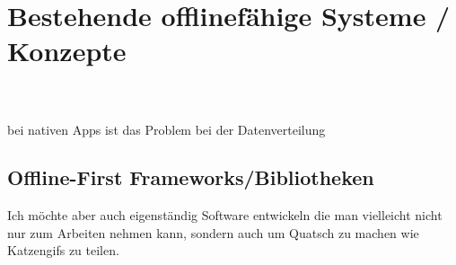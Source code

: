 \chapter{\label{chap:state}Bestehende offlinefähige Systeme / Konzepte}
\\
\\
bei nativen Apps ist das Problem bei der Datenverteilung
%
%
\section{\label{sec:frameworks}Offline-First Frameworks/Bibliotheken}
Ich möchte aber auch eigenständig Software entwickeln die man vielleicht nicht nur zum Arbeiten nehmen kann, sondern auch um Quatsch zu machen wie Katzengifs zu teilen.
%
%

%
%


%
%


%
%


%
%

